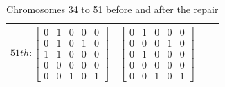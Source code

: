 \begin{table}[h]
\begin{tabular}{|c|c|c|c|}
            $51th : \begin{bmatrix}
                0 & 1 & 0 & 0 & 0 \\
                0 & 1 & 0 & 1 & 0 \\
                1 & 1 & 0 & 0 & 0 \\
                0 & 0 & 0 & 0 & 0 \\
                0 & 0 & 1 & 0 & 1
            \end{bmatrix}
            $&
            $\begin{bmatrix}
                0 & 1 & 0 & 0 & 0 \\
                0 & 0 & 0 & 1 & 0 \\
                0 & 1 & 0 & 0 & 0 \\
                0 & 0 & 0 & 0 & 0 \\
                0 & 0 & 1 & 0 & 1
            \end{bmatrix}
            $\\
            \hline
        \end{tabular}
        \caption{Chromosomes 34 to 51 before and after the repair}
        \label{repair1}
    \end{table}
    

